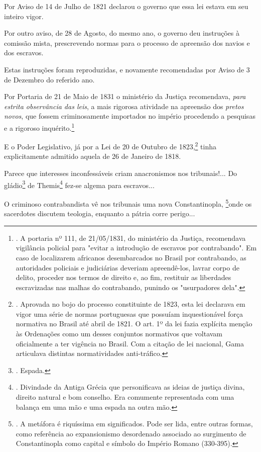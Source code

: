 Por Aviso de 14 de Julho de 1821 declarou o governo que essa lei estava
em seu inteiro vigor.

Por outro aviso, de 28 de Agosto, do mesmo ano, o governo deu instruções
à comissão mista, prescrevendo normas para o processo de apreensão dos
navios e dos escravos.

Estas instruções foram reproduzidas, e novamente recomendadas por Aviso
de 3 de Dezembro do referido ano.

Por Portaria de 21 de Maio de 1831 o ministério da Justiça recomendava,
\emph{para estrita observância das leis}, a mais rigorosa atividade na
apreensão dos \emph{pretos novos}, que fossem criminosamente importados
no império procedendo a pesquisas e a rigoroso inquérito.\footnote{. A
  portaria nº 111, de 21/05/1831, do ministério da Justiça, recomendava
  vigilância policial para "evitar a introdução de escravos por
  contrabando". Em caso de localizarem africanos desembarcados no Brasil
  por contrabando, as autoridades policiais e judiciárias deveriam
  apreendê-los, lavrar corpo de delito, proceder nos termos de direito
  e, ao fim, restituir as liberdades escravizadas nas malhas do
  contrabando, punindo os "usurpadores dela".}

E o Poder Legislativo, já por a Lei de 20 de Outubro de 1823,\footnote{.
  Aprovada no bojo do processo constituinte de 1823, esta lei declarava
  em vigor uma série de normas portuguesas que possuíam inquestionável
  força normativa no Brasil até abril de 1821. O art. 1º da lei fazia
  explícita menção às Ordenações como um desses conjuntos normativos que
  voltavam oficialmente a ter vigência no Brasil. Com a citação de lei
  nacional, Gama articulava distintas normatividades anti-tráfico.}
tinha explicitamente admitido aquela de 26 de Janeiro de 1818.

Parece que interesses inconfessáveis criam anacronismos nos
tribunais!... Do gládio\footnote{. Espada.} de Themis\footnote{.
  Divindade da Antiga Grécia que personificava as ideias de justiça
  divina, direito natural e bom conselho. Era comumente representada com
  uma balança em uma mão e uma espada na outra mão.} fez-se algema para
escravos...

O criminoso contrabandista vê nos tribunais uma nova Constantinopla,
\footnote{. A metáfora é riquíssima em significados. Pode ser lida,
  entre outras formas, como referência ao expansionismo desordenado
  associado ao surgimento de Constantinopla como capital e símbolo do
  Império Romano (330-395).}onde os sacerdotes discutem teologia,
enquanto a pátria corre perigo...

